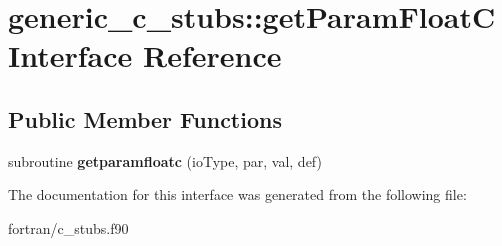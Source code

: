 \hypertarget{interfacegeneric__c__stubs_1_1get_param_float_c}{}\section{generic\+\_\+c\+\_\+stubs\+:\+:get\+Param\+FloatC Interface Reference}
\label{interfacegeneric__c__stubs_1_1get_param_float_c}
\subsection*{Public Member Functions}
\begin{DoxyCompactItemize}
\item 
\mbox{\label{interfacegeneric__c__stubs_1_1get_param_float_c_aaa8515aad49197ec8dca162364366d58}} 
subroutine {\bfseries getparamfloatc} (io\+Type, par, val, def)
\end{DoxyCompactItemize}


The documentation for this interface was generated from the following file\+:\begin{DoxyCompactItemize}
\item 
fortran/c\+\_\+stubs.\+f90\end{DoxyCompactItemize}

